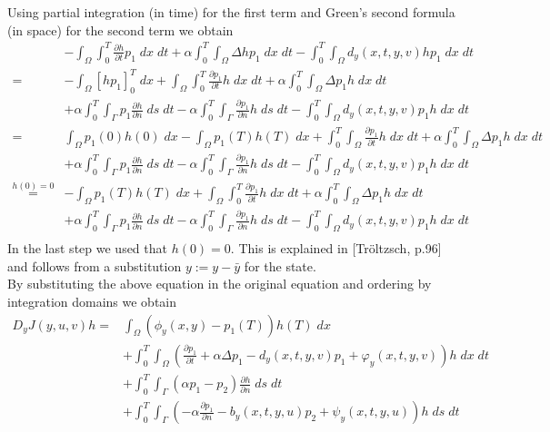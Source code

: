 \documentclass[
12pt, %
a4paper, %
onecolumn, %
portrait %
]{article}
\begin{document}
Using partial integration (in time) for the first term and Green's second formula (in space) for the second term we obtain
\begin{align*}
&- \int_{\Omega} \int_{0}^{T} \frac{\partial h}{\partial t} p_1 \; dx \; dt + \alpha \int_{0}^{T} \int_{\Omega}  \Delta h p_1 \; dx \; dt - \int_{0}^{T} \int_{\Omega} d_y(x,t,y,v) h p_1 \; dx \; dt\\
= &- \int_{\Omega} \left[h p_1 \right]_0^T \; dx + \int_{\Omega} \int_{0}^{T}   \frac{\partial p_1}{\partial t} h \; dx \; dt + \alpha \int_{0}^{T} \int_{\Omega} \Delta p_1 h \; dx \; dt \\ 
&+ \alpha \int_{0}^{T} \int_{\Gamma}
p_1 \frac{\partial h}{\partial n} \; ds \; dt - \alpha \int_{0}^{T} \int_{\Gamma}
\frac{\partial p_1}{\partial n} h \; ds \; dt
 - \int_{0}^{T} \int_{\Omega} d_y(x,t,y,v) p_1 h \; dx \; dt \\
= &\int_{\Omega} p_1(0) h(0) \; dx - \int_{\Omega} p_1(T) h(T) \; dx +  \int_{0}^{T} \int_{\Omega} \frac{\partial p_1}{\partial t} h \; dx \; dt + \alpha \int_{0}^{T} \int_{\Omega} \Delta p_1 h \; dx \; dt \\ 
&+ \alpha \int_{0}^{T} \int_{\Gamma}
p_1 \frac{\partial h}{\partial n} \; ds \; dt - \alpha \int_{0}^{T} \int_{\Gamma}
\frac{\partial p_1}{\partial n} h \; ds \; dt
 - \int_{0}^{T} \int_{\Omega} d_y(x,t,y,v) p_1 h \; dx \; dt \\
 \overset{h(0)=0}{=} & - \int_{\Omega} p_1(T) h(T) \; dx + \int_{\Omega} \int_{0}^{T}   \frac{\partial p_1}{\partial t} h \; dx \; dt + \alpha \int_{0}^{T} \int_{\Omega} \Delta p_1 h \; dx \; dt \\ 
&+ \alpha \int_{0}^{T} \int_{\Gamma}
p_1 \frac{\partial h}{\partial n} \; ds \; dt - \alpha \int_{0}^{T} \int_{\Gamma} \frac{\partial p_1}{\partial n} h \; ds \; dt
 - \int_{0}^{T} \int_{\Omega} d_y(x,t,y,v) p_1 h \; dx \; dt \\
\end{align*}
In the last step we used that $h(0) = 0$. This is explained in [Tr\"oltzsch, p.96] and follows from a substitution $y := y - \bar{y}$ for the state.\\
By substituting the above equation in the original equation and ordering by integration domains we obtain
\begin{align*}
D_y J(y,u,v) h = & \int_{\Omega} (\phi_y(x,y) - p_1(T)) h(T) \; dx \\
& + \int_{0}^{T} \int_{\Omega} (\frac{\partial p_1}{\partial t} + \alpha \Delta p_1 - d_y(x,t,y,v) p_1 + \varphi_y(x,t,y, v)) h \; dx \; dt  \\
& + \int_{0}^{T} \int_{\Gamma} (\alpha p_1 - p_2) \frac{\partial h}{\partial n} \; ds \; dt \\
& + \int_{0}^{T} \int_{\Gamma} (- \alpha \frac{\partial p_1}{\partial n} - b_y(x,t,y,u) p_2 + \psi_y(x,t,y, u))  h \; ds \; dt
\end{align*}
\end{document}
